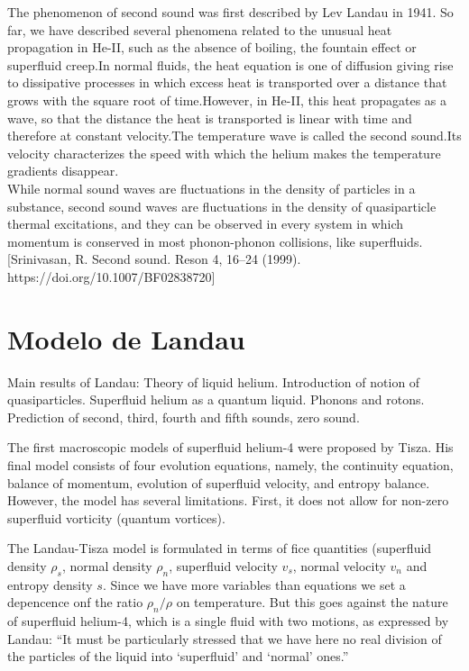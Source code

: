 \documentclass{article}
\begin{document}
The phenomenon of second sound was first described by Lev Landau in 1941. \cite{LevLan}
So far, we have described several phenomena related to the unusual heat propagation in He-II, such as the absence of boiling, the fountain effect or superfluid creep.In normal fluids, the heat equation is one of diffusion giving rise to dissipative processes in which excess heat is transported over a distance that grows with the square root of time.However, in He-II, this heat propagates as a wave, so that the distance the heat is transported is linear with time and therefore at constant velocity.The temperature wave is called the second sound.Its velocity characterizes the speed with which the helium makes the temperature gradients disappear.\\

While normal sound waves are fluctuations in the density of particles in a substance, second sound waves are fluctuations in the density of quasiparticle thermal excitations, and they can be observed in every system in which momentum is conserved in most phonon-phonon collisions, like superfluids. [Srinivasan, R. Second sound. Reson 4, 16–24 (1999). https://doi.org/10.1007/BF02838720]



\section{Modelo de Landau}
\cite{Kincl}
Main results of Landau:
Theory of liquid helium. Introduction of notion of quasiparticles. Superfluid
helium as a quantum liquid. Phonons and rotons. Prediction of second, third,
fourth and fifth sounds, zero sound.

\cite{PhysRev.60.356}

The first macroscopic models of superfluid helium-4 were
proposed by Tisza. His final model consists of four evolution equations, namely, the continuity equation, balance of momentum, evolution of superfluid velocity, and entropy balance. However, the model has several limitations. First, it does not allow for non-zero superfluid vorticity (quantum vortices). 

The Landau-Tisza model is formulated in terms of fice quantities (superfluid density $\rho_s$, normal density $\rho_n$, superfluid velocity $v_s$, normal velocity $v_n$ and entropy density $s$. Since we have more variables than equations we set a depencence onf the ratio $\rho_n/\rho$ on temperature. But this goes against the nature of superfluid helium-4, which is a single fluid with two motions, as expressed by Landau: “It must be particularly stressed that we
have here no real division of the particles of the liquid into ‘superfluid’
and ‘normal’ ones.”
\end{document}
